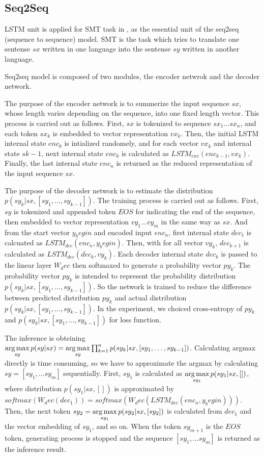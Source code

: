 \documentclass[senior,final,11pt]{iscs-thesis}
\newcommand{\argmax}{\mathop{\rm arg\,max}\limits}
\begin{document}
\subsection{Seq2Seq}

LSTM unit is applied for SMT task in \cite{seq2seq}, as the essential unit of the seq2seq (sequence to sequence) model.
SMT is the task which tries to translate one sentense $sx$ written in one language into the sentense $sy$ written in another language.

Seq2seq model is composed of two modules, the encoder netwrok and the decoder network.

The purpose of the encoder network is to summerize the input sequence $sx$, whose length varies depending on the sequence, into one fixed length vector.
This process is carried out as follows. 
First, $sx$ is tokenized to sequence $sx_{1} \dots sx_{n}$, and each token $sx_{k}$ is embedded to vector representation $vx_{k}$. 
Then, the initial LSTM internal state $enc_0$ is intialized randomely, 
and for each vector $vx_{k}$ and internal state $s{k-1}$, next internal state $enc_{k}$ is calculated as $ LSTM_{enc}(enc_{k-1},vx_{k}) $.
Finally, the last internal state $ enc_{n}$ is returned as the reduced representation of the input sequence $sx$.

The purpose of the decoder network is to estimate the distribution $ p(sy_k|sx,[sy_1,\dots,sy_{k-1}]) $. 
The training process is carried out as follows. 
First, $sy$ is tokenized and appended token $ EOS $ for indicating the end of the sequence, then embedded to vector representation $vy_{1} \dots vy_{m}$ in the same way as $sx$.
And from the start vector $y_begin$ and encoded input $ enc_{n} $, first internal state $ dec_{1}$ is calcuated as $ LSTM_{dec}(enc_{n},y_begin) $.
Then, with for all vector $vy_{k}$, $dec_{k+1}$ is calculated as $ LSTM_{dec}(dec_{k},vy_{k}) $.
Each decoder internal state $ dec_{k} $ is passed to the linear layer $ W_dec $ then softmaxed to generate a probability vector $ py_{k} $.
The probability vector $ py_{k} $ is intended to represent the probability distribution $ p(sy_k|sx,[sy_1,\dots,sy_{k-1}]) $.
So the network is trained to reduce the difference between predicted distribution $ py_{k} $ and actual distribution $ p(sy_k|sx,[sy_1,\dots,sy_{k-1}]) $.
In the experiment, we choiced cross-entropy of $ py_{k} $ and $ p(sy_k|sx,[sy_1,\dots,sy_{k-1}]) $ for loss function.

The inference is obteining $ \argmax_{sy} p(sy|sx) = \argmax_{sy} \prod_{k=1}^n p(sy_k|sx,[sy_1,\dots,sy_{k-1}]) $.
Calculating argmax directly is time consuming, so we have to approximate the argmax by calculating $sy = [sy_1, \dots sy_m]$ sequentially.
First, $sy_1$ is calculated as $ \argmax_{sy_1} p(sy_1|sx,[]) $, where distribution $ p(sy_1|sx,[]) $ is approximated by 
$ softmax(W_dec(dec_{1})) = softmax(W_dec(LSTM_{dec}(enc_{n},y_begin))) $. 
Then, the next token $sy_2 = \argmax_{sy_1} p(sy_2|sx,[sy_2]) $ is calculated from $ dec_{1} $ and the vector embedding of $sy_1$, and so on.
When the token $sy_{m+1}$ is the $ EOS $ token, generating process is stopped and the sequence $ [sy_1, \dots sy_m]$ is returned as the inference result.
\end{document}
